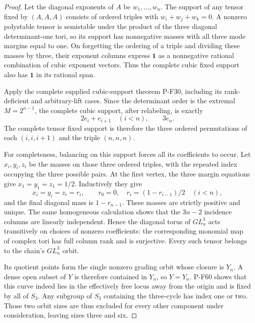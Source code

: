 \begin{proof}
Let the diagonal exponents of $A$ be $w_1,\ldots,w_n$.
The support of any tensor fixed by $(A,A,A)$ consists of
ordered triples with $w_i+w_j+w_k=0$.  A nonzero polystable
tensor is semistable under the product of the three diagonal
determinant-one tori,
so its support has nonnegative masses with all three mode
margins equal to one.  On forgetting the ordering of a triple
and dividing these masses by three, their exponent columns
express $\mathbf1$ as a nonnegative rational combination of
cubic exponent vectors.  Thus the complete cubic fixed support
also has $\mathbf1$ in its rational span.

Apply the complete supplied cubic-support theorem P-F30,
including its rank-deficient and arbitrary-lift cases.  Since
the determinant order is the extremal $M=2^{n-1}$, the complete
cubic support, after relabeling, is exactly
\[
                    2e_i+e_{i+1}\quad(i<n),\qquad 3e_n.
\]
The complete tensor fixed support is therefore the three ordered
permutations of each $(i,i,i+1)$ and the triple $(n,n,n)$.

For completeness, balancing on this support forces all its
coefficients to occur.  Let $x_i,y_i,z_i$ be the masses on those
three ordered triples, with the repeated index occupying the
three possible pairs.  At the first vertex, the three margin
equations give $x_1=y_1=z_1=1/2$.  Inductively they give
\[
 x_i=y_i=z_i=r_i,\qquad
 r_0=0,\quad r_i=(1-r_{i-1})/2\quad(i<n),
\]
and the final diagonal mass is $1-r_{n-1}$.  These masses are
strictly positive and unique.  The same homogeneous calculation
shows that the $3n-2$ incidence columns are linearly independent.
Hence the diagonal torus of $GL_n^3$ acts transitively on choices
of nonzero coefficients: the corresponding monomial map of
complex tori has full column rank and is surjective.  Every
such tensor belongs to the chain's $GL_n^3$ orbit.

Its quotient points form the single nonzero grading orbit
whose closure is $Y_n$.  A dense open subset of $Y$ is therefore
contained in $Y_n$, so $Y=Y_n$.  P-F60 shows that this curve
indeed lies in the effectively free locus away from the origin
and is fixed by all of $S_3$.  Any subgroup of $S_3$ containing
the three-cycle has index one or two.  Those two orbit sizes
are thus excluded for every other component under consideration,
leaving sizes three and six.
\end{proof}

